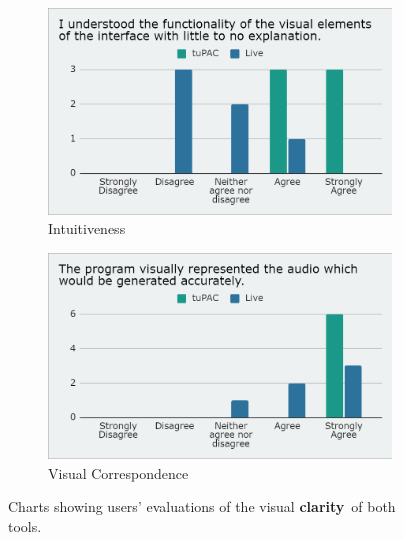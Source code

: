 \documentclass[12pt,a4paper,oneside,openright]{report}
\newcommand{\clarity}{\textbf{clarity}}
\begin{document}
\begin{figure}[h]
\centering
\begin{subfigure}{.5\textwidth}
  \centering
  \includegraphics[width=.9\linewidth]{images/questionnaire/intuitiveness.png}
  \caption{Intuitiveness}
  \label{fig:q_intu}
\end{subfigure}%
\begin{subfigure}{.5\textwidth}
  \centering
  \includegraphics[width=.9\linewidth]{images/questionnaire/visual_correspondence.png}
  \caption{Visual Correspondence}
  \label{fig:q_corresp}
\end{subfigure}
\caption{Charts showing users' evaluations of the visual \clarity\ of both tools.}
\label{fig:q_2}
\end{figure}
\end{document}
